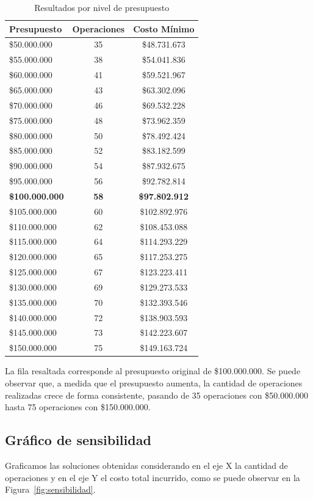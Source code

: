 \documentclass[a4paper,12pt]{book}
\begin{document}
	\begin{table}[htbp]
		\centering
		\caption{Resultados por nivel de presupuesto}
		\label{tab:sensibilidad}
		\begin{tabular}{lcc}
			\toprule
			\textbf{Presupuesto} & \textbf{Operaciones} & \textbf{Costo Mínimo} \\
			\midrule
			\$50.000.000  & 35 & \$48.731.673 \\
			\$55.000.000  & 38 & \$54.041.836 \\
			\$60.000.000  & 41 & \$59.521.967 \\
			\$65.000.000  & 43 & \$63.302.096 \\
			\$70.000.000  & 46 & \$69.532.228 \\
			\$75.000.000  & 48 & \$73.962.359 \\
			\$80.000.000  & 50 & \$78.492.424 \\
			\$85.000.000  & 52 & \$83.182.599 \\
			\$90.000.000  & 54 & \$87.932.675 \\
			\$95.000.000  & 56 & \$92.782.814 \\
			\textbf{\$100.000.000} & \textbf{58} & \textbf{\$97.802.912} \\
			\$105.000.000 & 60 & \$102.892.976 \\
			\$110.000.000 & 62 & \$108.453.088 \\
			\$115.000.000 & 64 & \$114.293.229 \\
			\$120.000.000 & 65 & \$117.253.275 \\
			\$125.000.000 & 67 & \$123.223.411 \\
			\$130.000.000 & 69 & \$129.273.533 \\
			\$135.000.000 & 70 & \$132.393.546 \\
			\$140.000.000 & 72 & \$138.903.593 \\
			\$145.000.000 & 73 & \$142.223.607 \\
			\$150.000.000 & 75 & \$149.163.724 \\
			\bottomrule
		\end{tabular}
	\end{table}
	\clearpage

	La fila resaltada corresponde al presupuesto original de \$100.000.000. Se puede observar que, a medida que el presupuesto aumenta, la cantidad de operaciones realizadas crece de forma consistente, pasando de 35 operaciones con \$50.000.000 hasta 75 operaciones con \$150.000.000.

	\subsection{Gráfico de sensibilidad}
	Graficamos las soluciones obtenidas considerando en el eje X la cantidad de operaciones y en el eje Y el costo total incurrido, como se puede observar en la Figura~\ref{fig:sensibilidad}.
\end{document}
